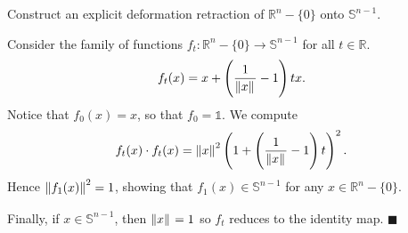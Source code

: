 \question Construct an explicit deformation retraction of $\mathbb{R}^n - \{0\}$ 
onto $\mathbb{S}^{n-1}$.

\begin{solution}
    Consider the family of functions $f_t: \mathbb{R}^n - \{0\} \rightarrow
    \mathbb{S}^{n-1}$ for all $t \in \mathbb{R}$.
    \begin{equation*}
        f_t(x) = x + \left( \frac{1}{\left\|{x}\right\|_{{}_{}}} - 1 \right)tx.
    \end{equation*}
    Notice that $f_0(x) = x$, so that $f_0 = \mathbb{1}$. We compute
    \begin{equation*}
        f_t(x) \cdot f_t(x) = \left\|{x}\right\|_{{}_{}}^2 \left( 1 + \left( 
            \frac{1}{\left\|{x}\right\|_{{}_{}}} - 1 \right)t \right)^2.
    \end{equation*}
    Hence $\left\|{f_1(x)}\right\|_{{}_{}}^2 = 1$, showing that $f_1(x) \in \mathbb{S}^{n-1}$ 
    for any $x \in \mathbb{R}^n - \{0\}$.

    Finally, if $x \in \mathbb{S}^{n-1}$, then $\left\|{x}\right\|_{{}_{}} = 1$ so $f_t$ reduces 
    to the identity map. \hfill $\blacksquare$
\end{solution}